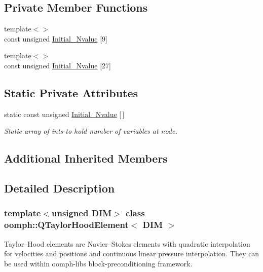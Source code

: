 \subsection*{Private Member Functions}
\begin{DoxyCompactItemize}
\item 
{\footnotesize template$<$$>$ }\\const unsigned \hyperlink{classoomph_1_1QTaylorHoodElement_ac3a47114c0d730eebb15f513b3c420b6}{Initial\+\_\+\+Nvalue} \mbox{[}9\mbox{]}
\item 
{\footnotesize template$<$$>$ }\\const unsigned \hyperlink{classoomph_1_1QTaylorHoodElement_a9e2986080ab54aec2bec9744ed52ad1d}{Initial\+\_\+\+Nvalue} \mbox{[}27\mbox{]}
\end{DoxyCompactItemize}
\subsection*{Static Private Attributes}
\begin{DoxyCompactItemize}
\item 
static const unsigned \hyperlink{classoomph_1_1QTaylorHoodElement_aba97d853ebfed50187f024d27a386737}{Initial\+\_\+\+Nvalue} \mbox{[}$\,$\mbox{]}
\begin{DoxyCompactList}\small\item\em Static array of ints to hold number of variables at node. \end{DoxyCompactList}\end{DoxyCompactItemize}
\subsection*{Additional Inherited Members}


\subsection{Detailed Description}
\subsubsection*{template$<$unsigned D\+IM$>$\newline
class oomph\+::\+Q\+Taylor\+Hood\+Element$<$ D\+I\+M $>$}

Taylor--Hood elements are Navier--Stokes elements with quadratic interpolation for velocities and positions and continuous linear pressure interpolation. They can be used within oomph-\/lib\textquotesingle{}s block-\/preconditioning framework. 

